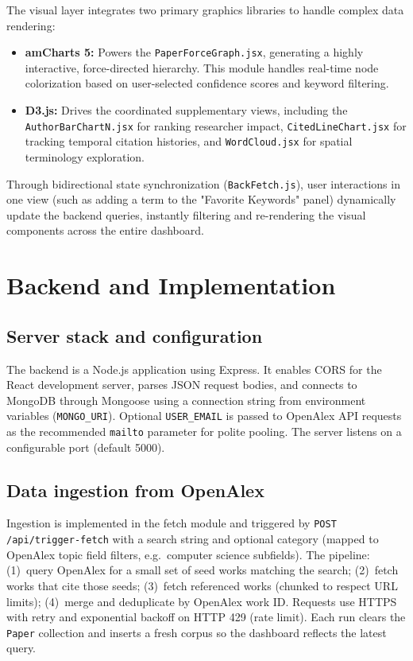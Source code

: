 \documentclass[sigconf]{acmart}
\begin{document}
The visual layer integrates two primary graphics libraries to handle complex data rendering:
\begin{itemize}
    \item \textbf{amCharts 5:} Powers the \texttt{PaperForceGraph.jsx}, generating a highly interactive, force-directed hierarchy. This module handles real-time node colorization based on user-selected confidence scores and keyword filtering.
    \item \textbf{D3.js:} Drives the coordinated supplementary views, including the \texttt{AuthorBarChartN.jsx} for ranking researcher impact, \texttt{CitedLineChart.jsx} for tracking temporal citation histories, and \texttt{WordCloud.jsx} for spatial terminology exploration. 
\end{itemize}
Through bidirectional state synchronization (\texttt{BackFetch.js}), user interactions in one view (such as adding a term to the "Favorite Keywords" panel) dynamically update the backend queries, instantly filtering and re-rendering the visual components across the entire dashboard.

\section{Backend and Implementation}
\subsection{Server stack and configuration}
The backend is a Node.js application using Express. It enables CORS for the React development server, parses JSON request bodies, and connects to MongoDB through Mongoose using a connection string from environment variables (\texttt{MONGO\_URI}). Optional \texttt{USER\_EMAIL} is passed to OpenAlex API requests as the recommended \texttt{mailto} parameter for polite pooling. The server listens on a configurable port (default 5000).

\subsection{Data ingestion from OpenAlex}
Ingestion is implemented in the fetch module and triggered by \texttt{POST /api/trigger-fetch} with a search string and optional category (mapped to OpenAlex topic field filters, e.g.\ computer science subfields). The pipeline: (1)~query OpenAlex for a small set of seed works matching the search; (2)~fetch works that cite those seeds; (3)~fetch referenced works (chunked to respect URL limits); (4)~merge and deduplicate by OpenAlex work ID. Requests use HTTPS with retry and exponential backoff on HTTP 429 (rate limit). Each run clears the \texttt{Paper} collection and inserts a fresh corpus so the dashboard reflects the latest query.
\end{document}
